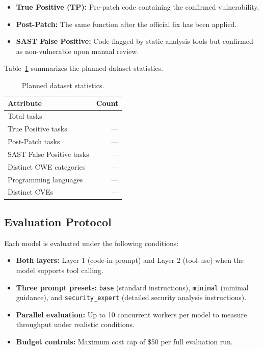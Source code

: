 \documentclass[10pt,twocolumn]{article}
\newcommand{\placeholder}{\textcolor{gray}{\textsf{---}}}
\begin{document}
\begin{itemize}[noitemsep,topsep=2pt]
    \item \textbf{True Positive (TP):} Pre-patch code containing the confirmed vulnerability.
    \item \textbf{Post-Patch:} The same function after the official fix has been applied.
    \item \textbf{SAST False Positive:} Code flagged by static analysis tools but confirmed as non-vulnerable upon manual review.
\end{itemize}

Table~\ref{tab:dataset_stats} summarizes the planned dataset statistics.

\begin{table}[t]
\centering
\caption{Planned dataset statistics.}
\label{tab:dataset_stats}
\small
\begin{tabular}{@{}l r@{}}
\toprule
\textbf{Attribute} & \textbf{Count} \\
\midrule
Total tasks                    & \placeholder \\
True Positive tasks            & \placeholder \\
Post-Patch tasks               & \placeholder \\
SAST False Positive tasks      & \placeholder \\
Distinct CWE categories        & \placeholder \\
Programming languages          & \placeholder \\
Distinct CVEs                  & \placeholder \\
\bottomrule
\end{tabular}
\end{table}

\subsection{Evaluation Protocol}
\label{sec:protocol}

Each model is evaluated under the following conditions:

\begin{itemize}[noitemsep,topsep=2pt]
    \item \textbf{Both layers:} Layer 1 (code-in-prompt) and Layer 2 (tool-use) when the model supports tool calling.
    \item \textbf{Three prompt presets:} \texttt{base} (standard instructions), \texttt{minimal} (minimal guidance), and \texttt{security\_expert} (detailed security analysis instructions).
    \item \textbf{Parallel evaluation:} Up to 10 concurrent workers per model to measure throughput under realistic conditions.
    \item \textbf{Budget controls:} Maximum cost cap of \$50 per full evaluation run.
\end{itemize}
\end{document}
